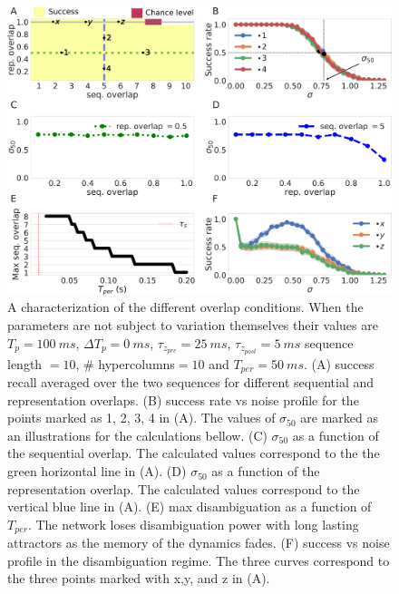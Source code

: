 \documentclass[10pt,a4paper]{article}
\begin{document}
\begin{figure}[H]
\centering
\includegraphics[scale=0.20]{representations.pdf}
\caption{A characterization of the different overlap conditions. When the parameters are not subject to variation themselves their values are $T_p= 100 \: ms$, $\Delta T_{p}= 0 \: ms$, $\tau_{z_{pre}} = 25 \: ms$, $\tau_{z_{post}} = 5 \: ms$ sequence length $=10$, \# hypercolumns$ = 10$ and $T_{per} = 50 \: ms$. (A) success recall averaged over the two sequences for different sequential and representation overlaps. (B) success rate vs noise profile for the points marked as 1, 2, 3, 4 in (A). The values of $\sigma_{50}$ are marked as an illustrations for the calculations bellow. (C) $\sigma_{50}$ as a function of the sequential overlap. The calculated values correspond to the the green horizontal line in (A). (D) $\sigma_{50}$ as a function of the representation overlap. The calculated values correspond to the vertical blue line in (A). (E) max disambiguation as a function of $T_{per}$. The network loses disambiguation power with long lasting attractors as the memory of the dynamics fades. (F) success vs noise profile in the disambiguation regime. The three curves correspond to the three points marked with x,y, and z in (A).}
\label{fig:representations}
\end{figure}


%
\end{document}
